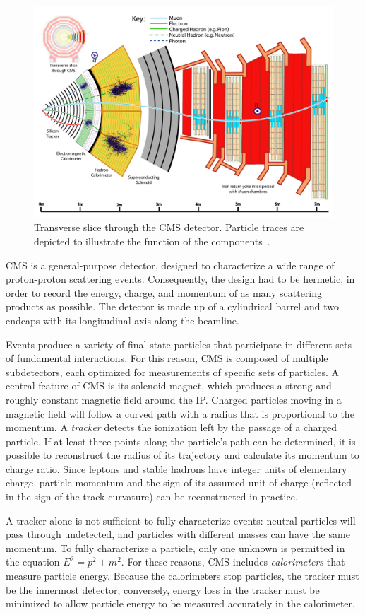 \begin{figure}[tb]
  \centering
  \includegraphics[width=0.7\linewidth]{figures/cms_slice_white}
  \caption[Transverse slice through the CMS detector]{Transverse slice
    through the CMS detector.  Particle traces are depicted to
  illustrate the function of the components~\cite{cmsoutreach}.}
  \label{fig:cms-slice}
\end{figure}

CMS is a general-purpose detector, designed to characterize a wide range of
proton-proton scattering events. Consequently, the design had to be hermetic, in
order to record the energy, charge, and momentum of as many scattering products
as possible. The detector is made up of a cylindrical barrel and two endcaps
with its longitudinal axis along the beamline.

Events produce a variety of final state particles that participate in different
sets of fundamental interactions. For this reason, CMS is composed of multiple
subdetectors, each optimized for measurements of specific sets of particles. A
central feature of CMS is its solenoid magnet, which produces a strong and
roughly constant magnetic field around the IP. Charged particles moving in a
magnetic field will follow a curved path with a radius that is proportional to
the momentum. A \textit{tracker} detects the ionization left by the passage of a
charged particle. If at least three points along the particle's path can be
determined, it is possible to reconstruct the radius of its trajectory and
calculate its momentum to charge ratio. Since leptons and stable hadrons have
integer units of elementary charge, particle momentum and the sign of its
assumed unit of charge (reflected in the sign of the track curvature) can be
reconstructed in practice.

A tracker alone is not sufficient to fully characterize events: neutral
particles will pass through undetected, and particles with different masses can
have the same momentum. To fully characterize a particle, only one unknown is
permitted in the equation $E^2 = p^2 + m^2$. For these reasons, CMS includes
\textit{calorimeters} that measure particle energy. Because the calorimeters
stop particles, the tracker must be the innermost detector; conversely, energy
loss in the tracker must be minimized to allow particle energy to be measured
accurately in the calorimeter.

